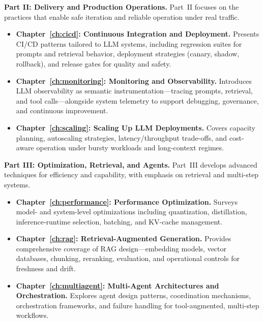 \medskip
\noindent\textbf{Part II: Delivery and Production Operations.}
Part~II focuses on the practices that enable safe iteration and reliable operation under real traffic.
\begin{itemize}
  \item \textbf{Chapter~\ref{ch:cicd}: Continuous Integration and Deployment.}
  Presents CI/CD patterns tailored to LLM systems, including regression suites for prompts and retrieval behavior, deployment strategies (canary, shadow, rollback), and release gates for quality and safety.
  \item \textbf{Chapter~\ref{ch:monitoring}: Monitoring and Observability.}
  Introduces LLM observability as semantic instrumentation---tracing prompts, retrieval, and tool calls---alongside system telemetry to support debugging, governance, and continuous improvement.
  \item \textbf{Chapter~\ref{ch:scaling}: Scaling Up LLM Deployments.}
  Covers capacity planning, autoscaling strategies, latency/throughput trade-offs, and cost-aware operation under bursty workloads and long-context regimes.
\end{itemize}

\medskip
\noindent\textbf{Part III: Optimization, Retrieval, and Agents.}
Part~III develops advanced techniques for efficiency and capability, with emphasis on retrieval and multi-step systems.
\begin{itemize}
  \item \textbf{Chapter~\ref{ch:performance}: Performance Optimization.}
  Surveys model- and system-level optimizations including quantization, distillation, inference-runtime selection, batching, and KV-cache management.
  \item \textbf{Chapter~\ref{ch:rag}: Retrieval-Augmented Generation.}
  Provides comprehensive coverage of RAG design---embedding models, vector databases, chunking, reranking, evaluation, and operational controls for freshness and drift.
  \item \textbf{Chapter~\ref{ch:multiagent}: Multi-Agent Architectures and Orchestration.}
  Explores agent design patterns, coordination mechanisms, orchestration frameworks, and failure handling for tool-augmented, multi-step workflows.
\end{itemize}

